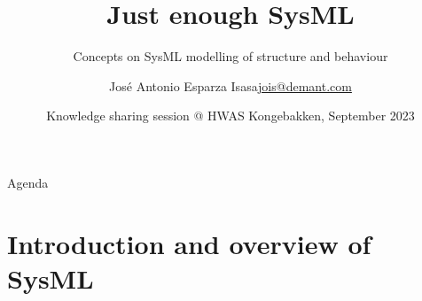 \documentclass[xcolor=dvipsnames,t]{beamer}
\title {Just enough SysML}
\subtitle {Concepts on SysML modelling of structure and behaviour}
\author[Jose A. Esparza Isasa (jois)]{{Jos\'e Antonio Esparza Isasa}\newline\url{jois@demant.com} }
\date[] %
{Knowledge sharing session @ HWAS \newline Kongebakken, September 2023}
\begin{document}
\begin{frame} %
\vspace{1cm}
\titlepage
\begin{center}
\end{center}
\end{frame}


\begin{frame}{Agenda}
 \tableofcontents

\end{frame}


\section{Introduction and overview of SysML}

\end{document}
